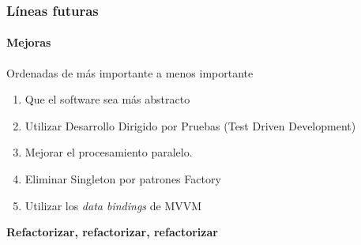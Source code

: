 \begin{frame}
	\frametitle{L\'ineas futuras}
	\framesubtitle{Mejoras}
	Ordenadas de m\'as importante a menos importante
	\begin{enumerate}
		\item Que el software sea m\'as abstracto
		\item Utilizar Desarrollo Dirigido por Pruebas (Test Driven Development)
		\item Mejorar el procesamiento paralelo.
		\item Eliminar Singleton por patrones Factory
		\item Utilizar los \emph{data bindings} de MVVM
	\end{enumerate}
	\textbf{Refactorizar, refactorizar, refactorizar}
\end{frame}